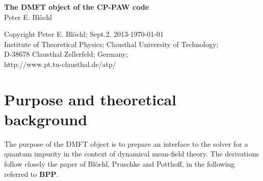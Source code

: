\documentclass[11pt,a4paper]{report}
\begin{document}
\begin{titlepage}
\begin{center}
\vspace*{3.5cm}
{\huge \textbf{The DMFT object of the CP-PAW code}}\\
\vspace{0.5cm}
{\large Peter E. Bl\"ochl}
\vspace{0.5cm} 
\end{center}

\vfill
\begin{center}
Copyright Peter E. Bl\"ochl; Sept.2, 2013-\today\\
{\small
Institute of Theoretical Physics;
Clausthal University of Technology;\\ 
D-38678 Clausthal Zellerfeld; Germany;\\
http://www.pt.tu-clausthal.de/atp/}
\end{center}
\end{titlepage}
\noindent            
\tableofcontents
\chapter{Purpose and theoretical background}
The purpose of the DMFT object is to prepare an interface to the
solver for a quantum impurity in the context of dynamical mean-field
theory. The derivations follow closely the paper of Bl\"ochl,
Pruschke and Potthoff\cite{bloechl13_prb88_25139}, in the following
referred to \textbf{BPP}.

\end{document}
